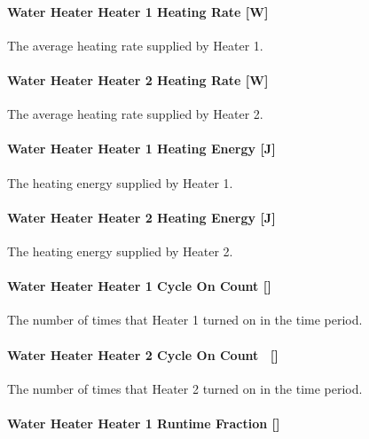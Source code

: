 \paragraph{Water Heater Heater 1 Heating Rate {[}W{]}}\label{water-heater-heater-1-heating-rate-w}

The average heating rate supplied by Heater 1.

\paragraph{Water Heater Heater 2 Heating Rate {[}W{]}}\label{water-heater-heater-2-heating-rate-w}

The average heating rate supplied by Heater 2.

\paragraph{Water Heater Heater 1 Heating Energy {[}J{]}}\label{water-heater-heater-1-heating-energy-j}

The heating energy supplied by Heater 1.

\paragraph{Water Heater Heater 2 Heating Energy {[}J{]}}\label{water-heater-heater-2-heating-energy-j}

The heating energy supplied by Heater 2.

\paragraph{Water Heater Heater 1 Cycle On Count {[]}}\label{water-heater-heater-1-cycle-on-count}

The number of times that Heater 1 turned on in the time period.

\paragraph{Water Heater Heater 2 Cycle On Count~ {[]}}\label{water-heater-heater-2-cycle-on-count}

The number of times that Heater 2 turned on in the time period.

\paragraph{Water Heater Heater 1 Runtime Fraction {[]}}\label{water-heater-heater-1-runtime-fraction}

